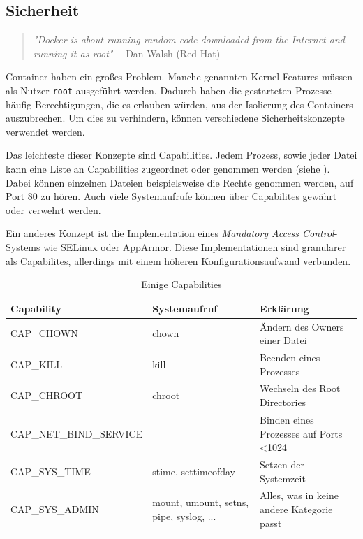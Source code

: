 \subsection{Sicherheit}
\label{sec:sicherheit}

\begin{quote}
	\textit{"Docker is about running random code downloaded from the Internet and running it as root"}
	\flushright
	\small{---Dan Walsh (Red Hat)}
\end{quote}

Container haben ein großes Problem. Manche genannten Kernel-Features müssen als Nutzer \texttt{root} ausgeführt werden. Dadurch haben die gestarteten Prozesse häufig Berechtigungen, die es erlauben würden, aus der Isolierung des Containers auszubrechen. Um dies zu verhindern, können verschiedene Sicherheitskonzepte verwendet werden.

Das leichteste dieser Konzepte sind Capabilities. Jedem Prozess, sowie jeder Datei kann eine Liste an Capabilities zugeordnet oder genommen werden (siehe ). Dabei können einzelnen Dateien beispielsweise die Rechte genommen werden, auf Port 80 zu hören. Auch viele Systemaufrufe können über Capabilites gewährt oder verwehrt werden.

Ein anderes Konzept ist die Implementation eines \textit{Mandatory Access Control}-Systems wie SELinux oder AppArmor. Diese Implementationen sind granularer als Capabilites, allerdings mit einem höheren Konfigurationsaufwand verbunden.

\begin{table}[h]
	\begin{center}
		\begin{tabu}to 0.9
			\toprule
			Capability 		& Systemaufruf 			& Erklärung						\\
			\midrule
			CAP\_CHOWN 		& chown 				& Ändern des Owners einer Datei \\
			CAP\_KILL 		& kill 					& Beenden eines Prozesses		\\
			CAP\_CHROOT		& chroot				& Wechseln des Root Directories	\\
			\midrule
			CAP\_NET\_BIND\_SERVICE & & Binden eines Prozesses auf Ports \textless 1024 \\
			\midrule
			CAP\_SYS\_TIME	& stime, settimeofday	& Setzen der Systemzeit 		\\
			CAP\_SYS\_ADMIN	& mount, umount, setns, pipe, syslog, ... 	& Alles, was in keine andere Kategorie passt 														\\
			\bottomrule
		\end{tabu}
	\end{center}
	\caption{Einige Capabilities \citep{Capabilities7LinuxManualPage}}
	\label{tab:capabilities}
\end{table}

